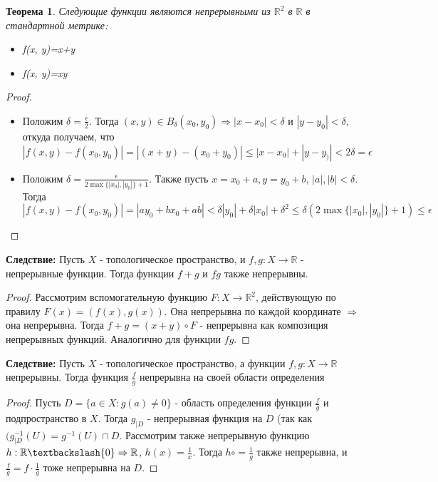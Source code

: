 \documentclass[a4paper,100pt]{article}
\theoremstyle{indented}
\newtheorem{theorem}{Теорема}
\begin{document}
\begin{theorem}
    Следующие функции являются непрерывными из $\mathbb{R}^2$ в $\mathbb{R}$ в стандартной метрике:
    \begin{itemize}
        \item f(x, y)=x+y
        \item f(x, y)=xy
    \end{itemize}
    \end{theorem}
    \begin{proof}
    ~
    \begin{itemize}
    \item Положим $\delta = \frac{\epsilon}{2}$. Тогда $(x, y) \in B_{\delta}(x_0, y_0) \Rightarrow |x-x_0| < \delta$ и $|y-y_0|<\delta$, откуда получаем, что $|f(x, y)-f(x_0, y_0)|=|(x+y)-(x_0+y_0)| \leq |x-x_0|+|y-y_)| <2\delta = \epsilon$
    \item Положим $\delta = \frac{\epsilon}{2\max\{|x_0|, |y_0|\}+1}$. Также пусть $x=x_0+a, y=y_0+b$, $|a|, |b| < \delta$. Тогда $|f(x, y)-f(x_0, y_0)|=|ay_0+bx_0+ab| < \delta |y_0| + \delta |x_0|+\delta^2 \leq \delta (2\max\{|x_0|, |y_0|\}+1) \leq \epsilon$
    \end{itemize}
    \end{proof}
    \textbf{Следствие:} Пусть $X$ - топологическое пространство, и $f, g: X \rightarrow \mathbb{R}$ - непрерывные функции. Тогда функции $f+g$ и $fg$ также непрерывны.
    \begin{proof}
    Рассмотрим вспомогательную функцию $F: X \rightarrow \mathbb{R}^2$, действующую по правилу $F(x)=(f(x), g(x))$. Она непрерывна по каждой координате $\Rightarrow$ она непрерывна. Тогда $f+g=(x+y) \circ F$ - непрерывна как композиция непрерывных функций. Аналогично для функции $fg$.
    \end{proof}
    \textbf{Следствие:} Пусть $X$ - топологическое пространство, а функции $f, g: X \rightarrow \mathbb{R}$ непрерывны. Тогда функция $\frac{f}{g}$ непрерывна на своей области определения
    \begin{proof}
    Пусть $D=\{a \in X : g(a) \neq 0\}$ - область определения функции $\frac{f}{g}$ и подпространство в $X$. Тогда $g_{|D}$ - непрерывная функция на $D$ (так как $(g^{-1}_{|D}(U)=g^{-1}(U) \cap D$. Рассмотрим также непрерывную функцию $h: \mathbb{R} \textbackslash \{0\} \Rightarrow \mathbb{R}$, $h(x)=\frac{1}{x}$. Тогда $h \circ = \frac{1}{g}$ также непрерывна, и $\frac{f}{g}=f \cdot \frac{1}{g}$ тоже непрерывна на $D$.
    \end{proof}
\end{document}
